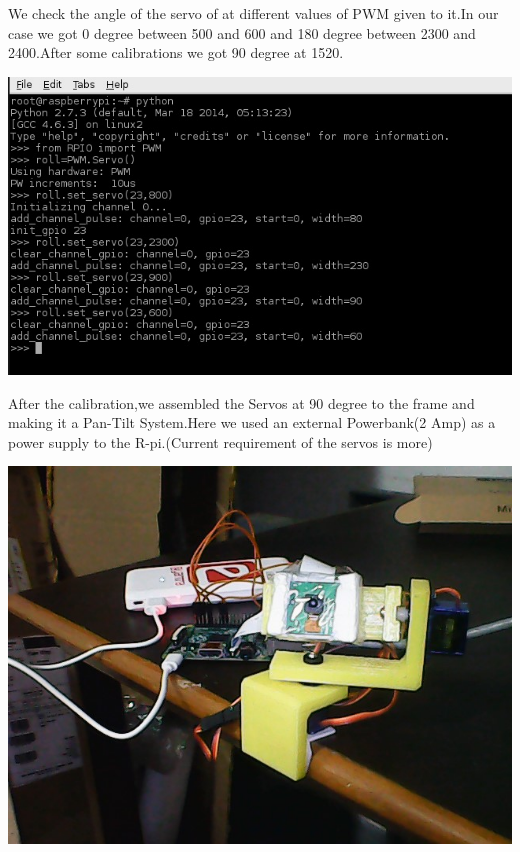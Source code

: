 \documentclass[11pt,a4paper]{article}
\begin{document}
We check the angle of the servo of at different values of PWM given to it.In our case we got 0 degree between 500 and 600 and 180 degree between 2300 and 2400.After some calibrations we got 90 degree at 1520.
	 \begin{center}
		   \includegraphics[scale=0.6]{cmd3.jpg}
		\end{center}
	 \par After the calibration,we assembled the Servos at 90 degree to the frame and making it a Pan-Tilt System.Here we used an external Powerbank(2 Amp) as a power supply to the R-pi.(Current requirement of the servos is more)
	  \begin{center}
		   \includegraphics[scale=0.6]{image.jpg}
		\end{center}
	 
\end{document}
